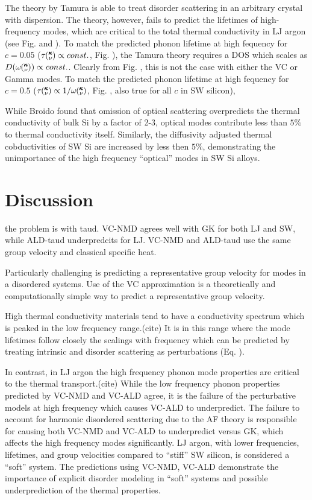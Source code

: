 \documentclass[aps,prb,twocolumn,superscriptaddress,preprintnumbers,amsmath,amssymb,floatfix]{revtex4}
\newcommand{\kv}{\mspace{-4.0mu}\left(\mspace{-8.0mu}
\begin{smallmatrix}&\pmb{\kappa} \\&\nu\end{smallmatrix}
\mspace{-3.0mu}\right)}
\begin{document}
The theory by Tamura is able to treat disorder scattering in an arbitrary 
crystal with dispersion. The theory, however, fails to predict the 
lifetimes of high-frequency modes, which are critical to the total 
thermal conductivity in LJ argon (see Fig. and ). To match the predicted 
phonon lifetime at high fequency for $c=0.05$ 
($\tau\kv \propto const.$, Fig. ), 
the Tamura theory requires a DOS which scales as 
$D(\omega\kv) \propto const.$. Clearly from Fig. , this is not the case 
with either the VC or Gamma modes. To match the predicted 
phonon lifetime at high fequency for $c=0.5$ 
($\tau\kv \propto 1/\omega\kv$, Fig. , also true for all $c$ in SW silicon), 

While Broido found that omission of optical scattering overpredicts 
the thermal 
conductivity of bulk Si by a factor of 2-3, 
optical modes contribute less than $5\%$ 
to thermal conductivity itself. Similarly, the diffusivity adjusted thermal 
cobductivities of SW Si are increased by less then $5\%$, demonstrating the 
unimportance of the high frequency ``optical'' modes in SW Si alloys.

\section{\label{S:}Discussion}

the problem is with taud.  VC-NMD agrees well with GK for both LJ and SW, 
while ALD-taud underpredcits for LJ.  VC-NMD and ALD-taud use the same 
group velocity and classical specific heat.

Particularly challenging is predicting a representative group velocity 
for modes in a disordered systems. 
Use of the VC approximation is a theoretically and 
computationally simple way to predict a representative group velocity.

High thermal conductivity materials tend to have a conductivity spectrum 
which is peaked in the low frequency range.(cite) 
It is in this range where the mode 
lifetimes follow closely the scalings with frequency which can be 
predicted by treating intrinsic and disorder scattering as 
perturbations (Eq. ).

In contrast, 
in LJ argon the high frequency phonon mode properties are critical 
to the thermal transport.(cite)  
While the low frequency phonon properties predicted by VC-NMD and 
VC-ALD agree, it is the failure of the perturbative models at 
high frequency which causes VC-ALD to underpredict. The failure 
to account for harmonic disordered scattering due to the AF theory 
is responsible for causing both VC-NMD and VC-ALD to underpredict 
versus GK, which affects the high frequency modes significantly. 
LJ argon, with lower 
frequencies, lifetimes, and group velocities compared to 
``stiff'' SW silicon, 
is considered a ``soft'' system. The predictions using 
VC-NMD, VC-ALD demonstrate the importance of explicit disorder 
modeling in ``soft'' systems and possible underprediction 
of the thermal properties.\cite{tian_phonon_2012}
\end{document}
